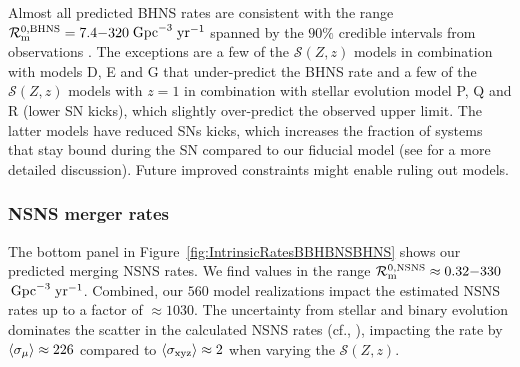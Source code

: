 \documentclass[fleqn,usenatbib]{mnras}
\newcommand\rate{\mathcal{R}}
\newcommand{\yearmin}{\ensuremath{\,\rm{yr}^{-1}}\xspace}
\newcommand{\GpcminThree}{\ensuremath{\,\rm{Gpc}^{-3}}\xspace}
\newcommand{\SFRD}{\ensuremath{\mathcal{S}(Z,z)}\xspace}
\newcommand{\Nmodels}{\ensuremath{560}\xspace}
\newcommand{\RateIntrinsicAzeroNSNSmin}{\ensuremath{0.32}\xspace}
\newcommand{\RateIntrinsicAzeroNSNSmax}{\ensuremath{330}\xspace}
\newcommand{\RateGWTCmaxBHNS}{\ensuremath{320}\xspace}
\newcommand{\RateGWTCminBHNS}{\ensuremath{7.4}\xspace}
\begin{document}
Almost all predicted \ac{BHNS} rates are consistent with the range $\rate_{\rm{m}}^{0,\rm{BHNS}} =  \RateGWTCminBHNS{-}\RateGWTCmaxBHNS$\GpcminThree\yearmin spanned by the $90\%$ credible intervals from observations  \citep{Abbott:2021GWTC3pop}. The exceptions are a few of the \SFRD models in combination with models D, E and G that under-predict the \ac{BHNS} rate and a few of the \SFRD models with $z=1$ in combination with stellar evolution model P, Q and R (lower \ac{SN} kicks),  which slightly over-predict the observed upper limit.  The latter models have reduced \acp{SN} kicks, which increases the fraction of systems that  stay bound during the \ac{SN} compared to our fiducial model (see   for a more detailed discussion). Future improved constraints might enable ruling out models.
%

\subsubsection{NSNS merger rates}

The bottom panel in Figure~\ref{fig:IntrinsicRatesBBHBNSBHNS} shows our predicted merging \ac{NSNS} rates.  We find values in the range $\rate_{\rm{m}}^{0,\rm{NSNS}}\approx  \RateIntrinsicAzeroNSNSmin{-}\RateIntrinsicAzeroNSNSmax$\GpcminThree \yearmin. Combined, our \Nmodels model realizations impact the estimated \ac{NSNS} rates up to a factor of $\approx 1030$. The uncertainty from stellar and binary evolution dominates the scatter in the calculated \ac{NSNS} rates (cf., \citealt{Santoliquido:2021}), impacting the rate by $\langle\sigma_{\rm{\mu}}\rangle \approx 226$ compared to $\langle \sigma_{\rm{xyz}}\rangle \approx 2$ when varying the \SFRD.  
\end{document}
